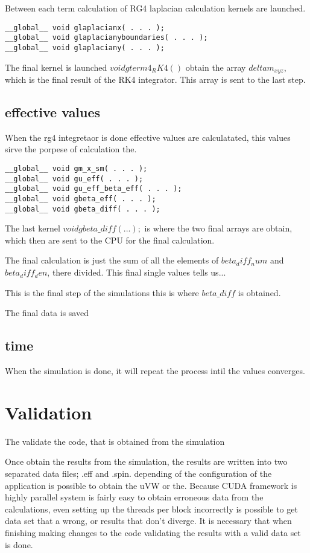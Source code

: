 Between each term calculation of RG4 laplacian calculation kernels are launched.

\begin{lstlisting}[frame=none]
__global__ void glaplacianx( . . . );
__global__ void glaplacianyboundaries( . . . );
__global__ void glaplaciany( . . . );
\end{lstlisting}

The final kernel is launched $void gterm4_RK4()$ obtain the array $deltam_{xyz}$, which is the final result of the RK4 integrator. This array is sent to the last step.

\subsection{effective values}

When the rg4 integretaor is done effective values are calculatated, this values sirve the porpese of calculation  the.


\begin{lstlisting}[frame=none]
__global__ void gm_x_sm( . . . );
__global__ void gu_eff( . . . );
__global__ void gu_eff_beta_eff( . . . );
__global__ void gbeta_eff( . . . );
__global__ void gbeta_diff( . . . );
\end{lstlisting}

The last kernel $ void gbeta\_diff( . . . );$ is where the two final arrays are obtain,
which then are sent to the CPU for the final calculation.

The final calculation is just the sum of all the elements of $beta_diff_num$ and $beta_diff_den$, there divided.
This final single values tells us...


This is the final step of the simulations this is where $beta\_diff$ is obtained.

The final data is saved
\subsection{time}

When the simulation is done, it will repeat the process intil the values converges.


\section{Validation}

The validate the code, that is obtained from the simulation

Once obtain the results from the simulation, the results are written into two separated data files; .eff and .spin. depending of the configuration of the application is possible to obtain the uVW or the. Because CUDA framework is highly parallel system is fairly easy to obtain erroneous data from the calculations, even setting up the threads per block incorrectly is possible to get data set that a wrong, or results that don't diverge. It is necessary that when finishing making changes to the code validating the results with a valid data set is done.


